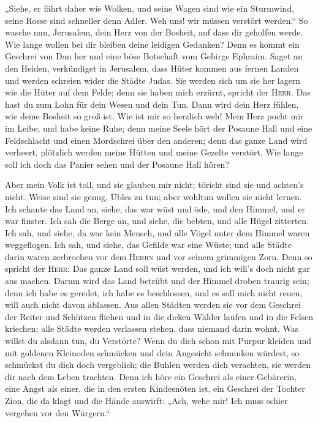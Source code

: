  „Siehe, er fährt daher wie Wolken, und seine Wagen sind
wie ein Sturmwind, seine Rosse sind schneller denn Adler. Weh uns! wir
müssen verstört werden.``  So wasche nun, Jerusalem, dein
Herz von der Bosheit, auf dass dir geholfen werde. Wie lange wollen bei
dir bleiben deine leidigen Gedanken?  Denn es kommt ein
Geschrei von Dan her und eine böse Botschaft vom Gebirge Ephraim.
 Saget an den Heiden, verkündiget in Jerusalem, dass
Hüter kommen aus fernen Landen und werden schreien wider die Städte
Judas.  Sie werden sich um sie her lagern wie die Hüter
auf dem Felde; denn sie haben mich erzürnt, spricht der \textsc{Herr}.
 Das hast du zum Lohn für dein Wesen und dein Tun. Dann
wird dein Herz fühlen, wie deine Bosheit so groß ist. 
Wie ist mir so herzlich weh! Mein Herz pocht mir im Leibe, und habe
keine Ruhe; denn meine Seele hört der Posaune Hall und eine Feldschlacht
 und einen Mordschrei über den anderen; denn das ganze
Land wird verheert, plötzlich werden meine Hütten und meine Gezelte
verstört.  Wie lange soll ich doch das Panier sehen und
der Posaune Hall hören?

 Aber mein Volk ist toll, und sie glauben mir nicht;
töricht sind sie und achten's nicht. Weise sind sie genug, Übles zu tun;
aber wohltun wollen sie nicht lernen.  Ich schaute das
Land an, siehe, das war wüst und öde, und den Himmel, und er war
finster.  Ich sah die Berge an, und siehe, die bebten,
und alle Hügel zitterten.  Ich sah, und siehe, da war
kein Mensch, und alle Vögel unter dem Himmel waren weggeflogen.
 Ich sah, und siehe, das Gefilde war eine Wüste; und alle
Städte darin waren zerbrochen vor dem \textsc{Herrn} und vor seinem
grimmigen Zorn.  Denn so spricht der \textsc{Herr}: Das
ganze Land soll wüst werden, und ich will's doch nicht gar aus machen.
 Darum wird das Land betrübt und der Himmel droben
traurig sein; denn ich habe es geredet, ich habe es beschlossen, und es
soll mich nicht reuen, will auch nicht davon ablassen. 
Aus allen Städten werden sie vor dem Geschrei der Reiter und Schützen
fliehen und in die dicken Wälder laufen und in die Felsen kriechen; alle
Städte werden verlassen stehen, dass niemand darin wohnt.
 Was willst du alsdann tun, du Verstörte? Wenn du dich
schon mit Purpur kleiden und mit goldenen Kleinoden schmücken und dein
Angesicht schminken würdest, so schmückst du dich doch vergeblich; die
Buhlen werden dich verachten, sie werden dir nach dem Leben trachten.
 Denn ich höre ein Geschrei als einer Gebärerin, eine
Angst als einer, die in den ersten Kindesnöten ist, ein Geschrei der
Tochter Zion, die da klagt und die Hände auswirft: „Ach, wehe mir! Ich
muss schier vergehen vor den Würgern.``

